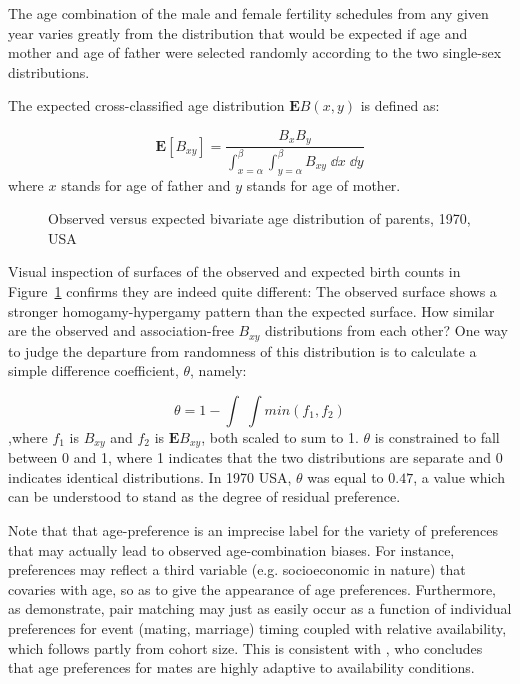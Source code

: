 
The age combination of the male and female fertility schedules from
any given year varies greatly from the distribution that would be expected if
age and mother and age of father were selected randomly according to the two
single-sex distributions.

The expected cross-classified age distribution $\textbf{E}B(x,y)$ is defined as:

\begin{equation}
\textbf{E}\left[B_{xy}\right] = \frac{B_x B_y}{\int _{x = \alpha} ^\beta \int
_{y = \alpha} ^\beta B_{xy} \; \dd x \;\dd y}
\end{equation}
where $x$ stands for age of father and $y$ stands for age of mother.

\begin{figure}[ht!]
        \centering  
          \caption{Observed versus expected bivariate age distribution of
          parents, 1970, USA}
          \label{fig:US1970obsexp}
\end{figure}


Visual inspection of surfaces of the observed and expected birth counts in
Figure~\ref{fig:US1970obsexp} confirms they are indeed quite different: The
observed surface shows a stronger homogamy-hypergamy pattern than the expected surface. How similar are the
observed and association-free $B_{xy}$ distributions from each other? One way to
judge the departure from randomness of this distribution is to calculate a
simple difference coefficient, $\theta$, namely:

\begin{equation}
\theta = 1 - \int \;\int min(f_1, f_2)
\end{equation}
,where $f_1$ is $B_{xy}$ and $f_2$ is $\textbf{E}B_{xy}$, both scaled to sum to
1. $\theta$ is constrained to fall between 0 and 1, where 1 indicates that the
two distributions are separate and 0 indicates identical distributions. In 1970 USA,
$\theta$ was equal to $0.47$, a value which can be understood to stand as the
degree of residual preference.

Note that that age-preference is an imprecise label for the variety
of preferences that may actually lead to observed age-combination biases. For
instance, preferences may reflect a third variable (e.g. socioeconomic
in nature) that covaries with age, so as to give the appearance of age
preferences. Furthermore, as \citet{bergstrom1994sweden}
demonstrate, pair matching may just as easily occur as a function of individual
preferences for event (mating, marriage) timing coupled with relative
availability, which follows partly from cohort size. This is consistent with
\citet{bhrolchain2001flexibility}, who concludes that age preferences for
mates are highly adaptive to availability conditions.

